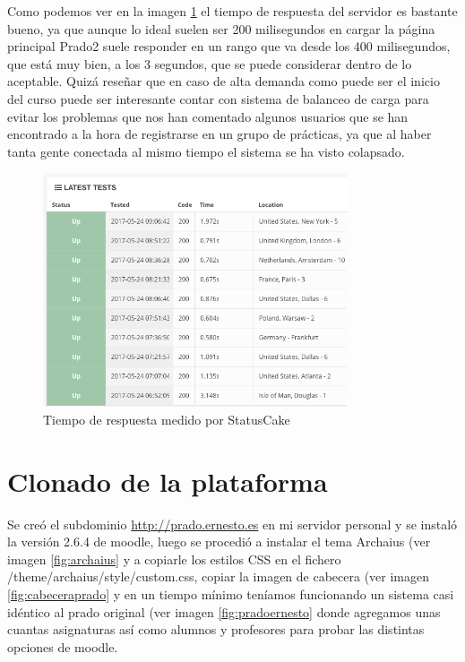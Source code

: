\bigskip
Como podemos ver en la imagen \ref{fig:statuscake2} el tiempo de respuesta del servidor es bastante bueno, ya que aunque lo ideal suelen ser 200 milisegundos en cargar la página principal Prado2 suele responder en un rango que va desde los 400 milisegundos, que está muy bien, a los 3 segundos, que se puede considerar dentro de lo aceptable. Quizá reseñar que en caso de alta demanda como puede ser el inicio del curso puede ser interesante contar con sistema de balanceo de carga para evitar los problemas que nos han comentado algunos usuarios que se han encontrado a la hora de registrarse en un grupo de prácticas, ya que al haber tanta gente conectada al mismo tiempo el sistema se ha visto colapsado.



\begin{figure}[H]
\centering
\includegraphics[width=0.8\textwidth]{../screenshots/statuscake2}
\caption{Tiempo de respuesta medido por StatusCake}
\label{fig:statuscake2}
\end{figure}


\section{Clonado de la plataforma}

Se creó el subdominio \url{http://prado.ernesto.es} en mi servidor personal y se instaló la versión 2.6.4 de moodle, luego se procedió a instalar el tema Archaius  (ver imagen \ref{fig:archaius} y a copiarle los estilos CSS en el fichero /theme/archaius/style/custom.css, copiar la imagen de cabecera (ver imagen \ref{fig:cabeceraprado} y en un tiempo mínimo teníamos funcionando un sistema casi idéntico al prado original (ver imagen \ref{fig:pradoernesto} donde agregamos unas cuantas asignaturas así como alumnos y profesores para probar las distintas opciones de moodle.

